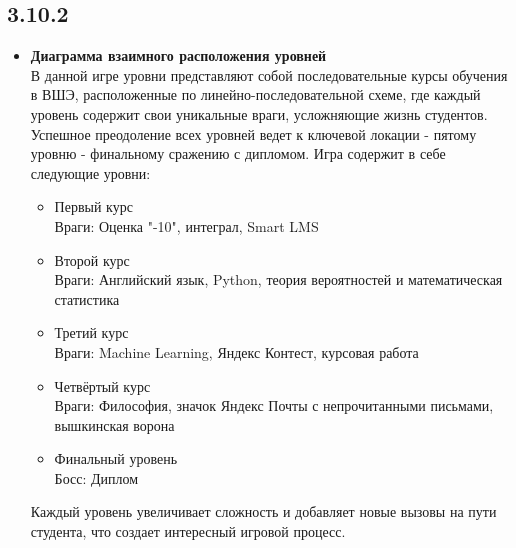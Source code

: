 \documentclass{article}
\begin{document}
\subsection*{3.10.2}

\begin{itemize}
    \item \textbf{Диаграмма взаимного расположения уровней} \\
    В данной игре уровни представляют собой последовательные курсы обучения в ВШЭ, расположенные по линейно-последовательной схеме, где каждый уровень содержит свои уникальные враги, усложняющие жизнь студентов. Успешное преодоление всех уровней ведет к ключевой локации - пятому уровню - финальному сражению с дипломом.
    Игра содержит в себе следующие уровни:
    \begin{itemize}
        \item Первый курс
        \\Враги: Оценка "-10", интеграл, Smart LMS
        \item Второй курс
        \\Враги: Английский язык, Python, теория вероятностей и математическая статистика
        \item Третий курс
        \\Враги: Machine Learning, Яндекс Контест, курсовая работа
        \item Четвёртый курс
        \\Враги: Философия, значок Яндекс Почты с непрочитанными письмами, вышкинская ворона
        \item Финальный уровень
       \\ Босс: Диплом
    \end{itemize}
    Каждый уровень увеличивает сложность и добавляет новые вызовы на пути студента, что создает интересный игровой процесс.
\end{itemize}
\end{document}
